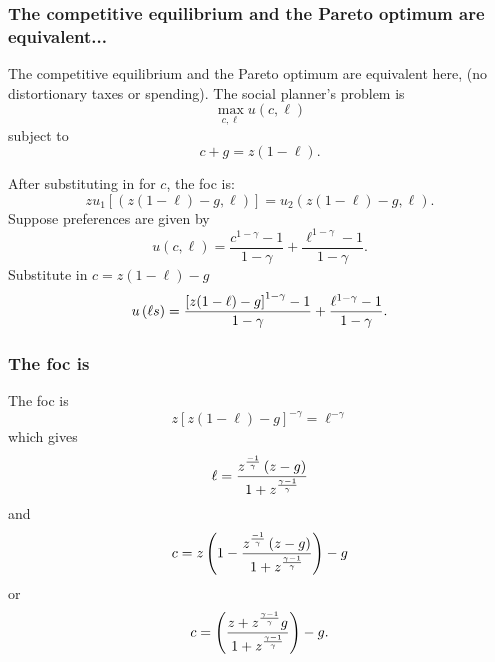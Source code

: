 \documentclass[aspectratio=169]{ltx-talk}
\begin{document}
\begin{frame}
\frametitle{The competitive equilibrium and the Pareto optimum are equivalent...}
The competitive equilibrium and the Pareto optimum are equivalent here, (no
distortionary taxes or spending). The social planner's problem is 
\begin{equation*}
\underset{c,\ell }{\max }u\left( c,\ell \right)
\end{equation*}%
subject to 
\begin{equation*}
c+g=z(1-\ell ).
\end{equation*}

After substituting in for $c$, the foc is: 
\begin{equation*}
zu_{1}\left[ \left( z\left( 1-\ell \right) -g,\ell \right) \right]
=u_{2}\left( z\left( 1-\ell \right) -g,\ell \right) .
\end{equation*}%
Suppose preferences are given by 
\begin{equation*}
u\left( c,\ell \right) =\frac{c^{1-\gamma }-1}{1-\gamma }+\frac{\ell
^{1-\gamma }-1}{1-\gamma }.
\end{equation*}%
Substitute in $c=z(1-\ell )-g$ 
\begin{equation*}
u\left( \ell s\right) =\frac{\left[ z(1-\ell )-g\right] ^{1-\gamma }-1}{%
1-\gamma }+\frac{\ell ^{1-\gamma }-1}{1-\gamma }.
\end{equation*}%
\end{frame}

\begin{frame}
\frametitle{The foc is}
The foc is%
\begin{equation*}
z\left[ z(1-\ell )-g\right] ^{-\gamma }=\ell ^{-\gamma }
\end{equation*}%
which gives 
\begin{equation*}
\ell =\frac{z^{\frac{-1}{\gamma }}\left( z-g\right) }{1+z^{\frac{\gamma -1}{%
\gamma }}}
\end{equation*}%
and%
\begin{equation*}
c=z\left( 1-\frac{z^{\frac{-1}{\gamma }}\left( z-g\right) }{1+z^{\frac{%
\gamma -1}{\gamma }}}\right) -g
\end{equation*}%
or%
\begin{equation*}
c=\left( \frac{z+z^{\frac{\gamma -1}{\gamma }}g}{1+z^{\frac{\gamma -1}{%
\gamma }}}\right) -g.
\end{equation*}%
\end{frame}
\end{document}
